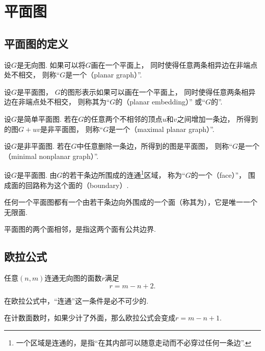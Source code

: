 \section{平面图}
\subsection{平面图的定义}
设\(G\)是无向图.
如果可以将\(G\)画在一个平面上，
同时使得任意两条相异边在非端点处不相交，
则称“\(G\)是一个（planar graph）”.

设\(G\)是平面图，
\(G\)的图形表示如果可以画在一个平面上，
同时使得任意两条相异边在非端点处不相交，
则称其为“\(G\)的（planar embedding）”
或“\(G\)的”.

\begin{definition}
设\(G\)是简单平面图.
若在\(G\)的任意两个不相邻的顶点\(u\)和\(v\)之间增加一条边，
所得到的图\(G+uv\)是非平面图，
则称“\(G\)是一个（maximal planar graph）”.
\end{definition}

\begin{definition}
设\(G\)是非平面图.
若在\(G\)中任意删除一条边，所得到的图是平面图，
则称“\(G\)是一个（minimal nonplanar graph）”.
\end{definition}

\begin{definition}
设\(G\)是平面图.
由\(G\)的若干条边所围成的连通\footnote{
	一个区域是连通的，是指“在其内部可以随意走动而不必穿过任何一条边”.
}区域，
称为“\(G\)的一个（face）”，
围成面的回路称为这个面的（boundary）.
\end{definition}
\begin{remark}
任何一个平面图都有一个由若干条边向外围成的一个面（称其为），它是唯一一个无限面.
\end{remark}

平面图的两个面相邻，是指这两个面有公共边界.

\subsection{欧拉公式}
\begin{theorem}
任意\((n,m)\)连通无向图的面数\(r\)满足\begin{equation}
	r = m - n + 2.
\end{equation}
\end{theorem}
\begin{remark}
在欧拉公式中，“连通”这一条件是必不可少的.
\end{remark}
\begin{remark}
在计数面数时，如果少计了外面，那么欧拉公式会变成\(r = m - n + 1\).
\end{remark}

